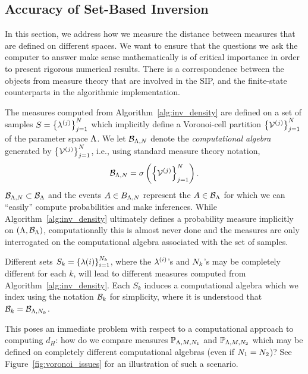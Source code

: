 \subsection{Accuracy of Set-Based Inversion}\label{sec:ch03-set}


In this section, we address how we measure the distance between measures that are defined on different spaces.
We want to ensure that the questions we ask the computer to answer make sense mathematically is of critical importance in order to present rigorous numerical results.
There is a correspondence between the objects from measure theory that are involved in the SIP, and the finite-state counterparts in the algorithmic implementation.




The measures computed from Algorithm~\ref{alg:inv_density} are defined on a set of samples $S = \left\{\lambda^{(j)}\right\}_{j=1}^{N}$ which implicitly define a Voronoi-cell partition $\left\{\mathcal{V}^{(j)}\right\}_{j=1}^{N}$ of the parameter space ${\Lambda}$.
We let $\mathcal{B}_{{\Lambda}, N}$ denote the \emph{computational algebra} generated by $\left\{\mathcal{V}^{(j)}\right\}_{j=1}^{N}$, i.e., using standard measure theory notation,
$$
	\mathcal{B}_{{\Lambda},N} = \sigma\left(\left\{\mathcal{V}^{(j)}\right\}_{j=1}^{N}\right).
$$
$\mathcal{B}_{{\Lambda}, N}\subset \mathcal{B}_{\Lambda}$ and the events $A\in B_{{\Lambda}, N}$ represent the $A\in\mathcal{B}_{\Lambda}$ for which we can ``easily'' compute probabilities and make inferences.
While Algorithm~\ref{alg:inv_density} ultimately defines a probability measure implicitly on $({\Lambda},\mathcal{B}_{\Lambda})$, computationally this is almost never done and the measures are only interrogated on the computational algebra associated with the set of samples.

Different sets $S_k = \left\{\lambda{(i)}\right\}_{i=1}^{N_k}$, where the $\lambda^{(i)}$'s and $N_k$'s may be completely different for each $k$, will lead to different measures computed from Algorithm~\ref{alg:inv_density}.
Each $S_k$ induces a computational algebra which we index using the notation $\mathcal{B}_{k}$ for simplicity, where it is understood that $\mathcal{B}_k = \mathcal{B}_{{\Lambda}, N_k}$.

This poses an immediate problem with respect to a computational approach to computing $d_H$: how do we compare measures $\mathbb{P}_{{\Lambda}, M, N_1}$ and $\mathbb{P}_{{\Lambda}, M, N_2}$ which may be defined on completely different computational algebras (even if $N_1=N_2$)?
See Figure~\ref{fig:voronoi_issues} for an illustration of such a scenario.

